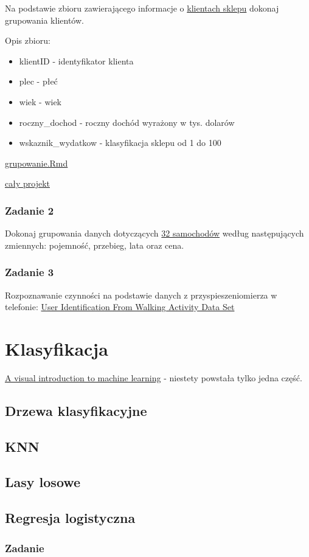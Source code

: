 \documentclass[]{book}
\providecommand{\tightlist}{%
  \setlength{\itemsep}{0pt}\setlength{\parskip}{0pt}}
\begin{document}
Na podstawie zbioru zawierającego informacje o
\href{data/klienci.csv}{klientach sklepu} dokonaj grupowania klientów.

Opis zbioru:

\begin{itemize}
\tightlist
\item
  klientID - identyfikator klienta
\item
  plec - płeć
\item
  wiek - wiek
\item
  roczny\_dochod - roczny dochód wyrażony w tys. dolarów
\item
  wskaznik\_wydatkow - klasyfikacja sklepu od 1 do 100
\end{itemize}

\href{res/grupowanie.Rmd}{grupowanie.Rmd}

\href{res/adr.zip}{cały projekt}

\subsection{Zadanie 2}\label{zadanie-2-1}

Dokonaj grupowania danych dotyczących \href{data/auta.csv}{32
samochodów} według następujących zmiennych: pojemność, przebieg, lata
oraz cena.

\subsection{Zadanie 3}\label{zadanie-3}

Rozpoznawanie czynności na podstawie danych z przyspieszeniomierza w
telefonie:
\href{http://archive.ics.uci.edu/ml/datasets/User+Identification+From+Walking+Activity\#}{User
Identification From Walking Activity Data Set}

\chapter{Klasyfikacja}\label{klasyfikacja}

\href{http://www.r2d3.us/visual-intro-to-machine-learning-part-1/}{A
visual introduction to machine learning} - niestety powstała tylko jedna
część.

\section{Drzewa klasyfikacyjne}\label{drzewa-klasyfikacyjne}

\section{KNN}\label{knn}

\section{Lasy losowe}\label{lasy-losowe}

\section{Regresja logistyczna}\label{regresja-logistyczna}

\subsection{Zadanie}\label{zadanie-4}
\end{document}
